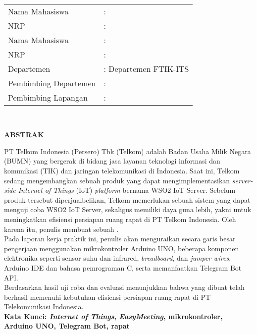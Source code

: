 \thispagestyle{plain}
\begin{centering}
	\textbf{\MakeUppercase{\judul}}
\end{centering} \\[20pt]
\begin{tabular}{ll}
	Nama Mahasiswa  &: \MakeUppercase{\namaPenulisSatu} \\
	NRP &: \nrpPenulisSatu \\
	Nama Mahasiswa  & : \MakeUppercase{\namaPenulisDua} \\
	NRP &: \nrpPenulisDua \\
	Departemen  &: Departemen \departemen FTIK-ITS \\
	Pembimbing Departemen  &: \pembimbingDept \\
	Pembimbing Lapangan  &: \pembimbingLap
\end{tabular} \\[10pt]
\begin{center}
	\textbf{ABSTRAK}
\end{center}
\indent\indent PT Telkom Indonesia (Persero) Tbk (Telkom) adalah Badan Usaha Milik Negara (BUMN) yang bergerak di bidang jasa layanan teknologi informasi dan komunikasi (TIK) dan jaringan telekomunikasi di Indonesia. Saat ini, Telkom sedang mengembangkan sebuah produk yang dapat mengimplementasikan \textit{server-side Internet of Things} (IoT) \textit{platform} bernama WSO2 IoT Server. Sebelum produk tersebut diperjualbelikan, Telkom memerlukan sebuah sistem yang dapat menguji coba WSO2 IoT Server, sekaligus memiliki daya guna lebih, yakni untuk meningkatkan efisiensi persiapan ruang rapat di PT Telkom Indonesia. Oleh karena itu, penulis membuat sebuah \namaSistem. \\
\indent Pada laporan kerja praktik ini, penulis akan menguraikan secara garis besar pengerjaan \namaSistem menggunakan mikrokontroler Arduino UNO, beberapa komponen elektronika seperti sensor suhu dan infrared, \textit{breadboard}, dan \textit{jumper wires}, Arduino IDE dan bahasa pemrograman C, serta memanfaatkan Telegram Bot API.\\
\indent Berdasarkan hasil uji coba dan evaluasi menunjukkan bahwa \namaSistem yang dibuat telah berhasil memenuhi kebutuhan efisiensi persiapan ruang rapat di PT Telekomunikasi Indonesia. \\[10pt]
\textbf{Kata Kunci: \textit{Internet of Things}, \textit{EasyMeeting}, mikrokontroler, Arduino UNO, Telegram Bot, rapat}


\cleardoublepage
